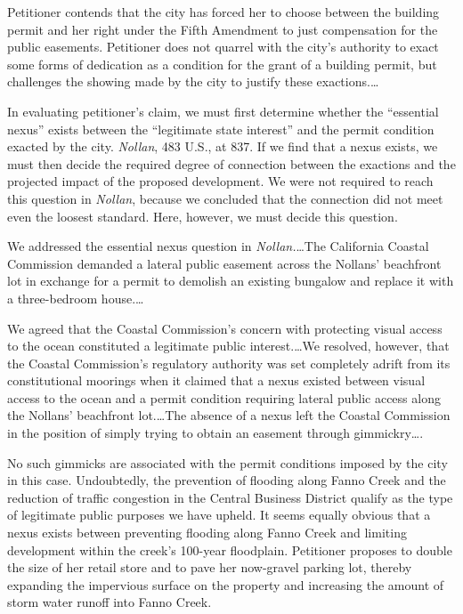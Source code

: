 Petitioner contends that the city has forced her to choose between the building
permit and her right under the Fifth Amendment to just compensation for the
public easements. Petitioner does not quarrel with the city's authority to exact
some forms of dedication as a condition for the grant of a building permit, but
challenges the showing made by the city to justify these exactions.\ldots



In evaluating petitioner's claim, we must first determine whether the
``essential nexus'' exists between the ``legitimate state interest'' and the
permit condition exacted by the city. \textit{Nollan}, 483 U.S., at 837. If we
find that a nexus exists, we must then decide the required degree of connection
between the exactions and the projected impact of the proposed development. We
were not required to reach this question in \textit{Nollan}, because we
concluded that the connection did not meet even the loosest standard. Here,
however, we must decide this question.



We addressed the essential nexus question in \textit{Nollan.}\ldots The
California Coastal Commission demanded a lateral public easement across the
Nollans' beachfront lot in exchange for a permit to demolish an existing
bungalow and replace it with a three-bedroom house.\ldots

We agreed that the Coastal Commission's concern with protecting visual access to
the ocean constituted a legitimate public interest.\ldots We resolved, however,
that the Coastal Commission's regulatory authority was set completely adrift
from its constitutional moorings when it claimed that a nexus existed between
visual access to the ocean and a permit condition requiring lateral public
access along the Nollans' beachfront lot.\ldots The absence of a nexus left the
Coastal Commission in the position of simply trying to obtain an easement
through gimmickry\ldots.

No such gimmicks are associated with the permit conditions imposed by the city
in this case. Undoubtedly, the prevention of flooding along Fanno Creek and the
reduction of traffic congestion in the Central Business District qualify as the
type of legitimate public purposes we have upheld. It seems equally obvious that
a nexus exists between preventing flooding along Fanno Creek and limiting
development within the creek's 100-year floodplain. Petitioner proposes to
double the size of her retail store and to pave her now-gravel parking lot,
thereby expanding the impervious surface on the property and increasing the
amount of storm water runoff into Fanno Creek.

